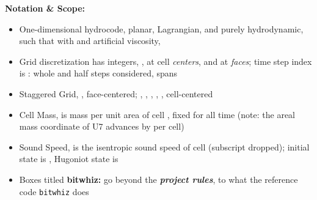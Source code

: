 \documentclass[11pt,addpoints]{exam}
\begin{document}
\begin{tcolorbox}[breakable]
\textbf{Notation \& Scope:}\vspace{.5em}
\begin{itemize}
\item One-dimensional hydrocode, planar, Lagrangian, and purely hydrodynamic, such that \hspace{3mm}  \hspace{5mm} with  and artificial viscosity, \vspace{.5em}
\item Grid discretization has integers, , at cell \emph{centers}, and  at \emph{faces}; \hspace{2mm} time step index is : whole and half steps considered,  spans \vspace{.5em}
\item Staggered Grid, \hspace{3mm} ,  \hspace{2mm} face-centered; \hspace{3mm} \bm{$\rho$}, , , , ,  \hspace{2mm} cell-centered\vspace{.5em}
\item Cell Mass, \hspace{3mm}  \hspace{5mm} is mass per unit area of cell , fixed for all time \hspace{3mm} (note: the areal mass coordinate  of U7 advances by  per cell)\vspace{.5em}
\item Sound Speed, \hspace{3mm}  \hspace{3mm} is the isentropic sound speed of cell  (subscript  dropped); \hspace{2mm} initial state is , Hugoniot state is \vspace{.5em}
\item Boxes titled \textbf{bitwhiz:} go beyond the \textbf{\emph{project rules}}, to what the reference code \texttt{bitwhiz} does
\end{itemize}
\end{tcolorbox}
\end{document}
